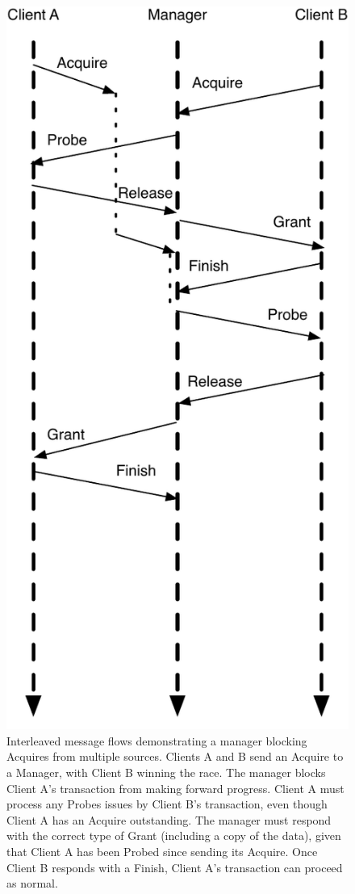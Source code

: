 \begin{figure}[p]
\centering
\includegraphics[width=0.5\columnwidth]{tilelink/figures/ordered.pdf}
\caption[Interleaved but well-ordered message flows.]{
Interleaved message flows demonstrating a manager blocking Acquires from multiple sources.
Clients A and B send an Acquire to a Manager, with Client B winning the race.
The manager blocks Client A's transaction from making forward progress.
Client A must process any Probes issues by Client B's transaction, even though Client A has an Acquire outstanding.
The manager must respond with the correct type of Grant (including a copy of the data), given that Client A has been Probed since sending its Acquire.
Once Client B responds with a Finish, Client A's transaction can proceed as normal.
}
\label{fig:ordered}
\end{figure}

